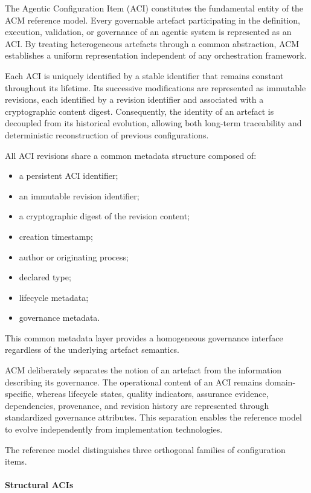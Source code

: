 \documentclass[10pt]{article}
\begin{document}
The Agentic Configuration Item (ACI) constitutes the fundamental entity of the ACM reference model. Every governable artefact participating in the definition, execution, validation, or governance of an agentic system is represented as an ACI. By treating heterogeneous artefacts through a common abstraction, ACM establishes a uniform representation independent of any orchestration framework.

Each ACI is uniquely identified by a stable identifier that remains constant throughout its lifetime. Its successive modifications are represented as immutable revisions, each identified by a revision identifier and associated with a cryptographic content digest. Consequently, the identity of an artefact is decoupled from its historical evolution, allowing both long-term traceability and deterministic reconstruction of previous configurations.

All ACI revisions share a common metadata structure composed of:

\begin{itemize}
    \item a persistent ACI identifier;
    \item an immutable revision identifier;
    \item a cryptographic digest of the revision content;
    \item creation timestamp;
    \item author or originating process;
    \item declared type;
    \item lifecycle metadata;
    \item governance metadata.
\end{itemize}

This common metadata layer provides a homogeneous governance interface regardless of the underlying artefact semantics.

ACM deliberately separates the notion of an artefact from the information describing its governance. The operational content of an ACI remains domain-specific, whereas lifecycle states, quality indicators, assurance evidence, dependencies, provenance, and revision history are represented through standardized governance attributes. This separation enables the reference model to evolve independently from implementation technologies.

The reference model distinguishes three orthogonal families of configuration items.

\paragraph{Structural ACIs}
\end{document}
